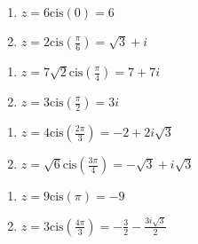 \begin{multicols}{2}

\begin{enumerate}

\setcounter{enumi}{\value{HW}}

\item $z = 6\text{cis}(0) = 6$
\item $z = 2\text{cis}\left(\frac{\pi}{6}\right) = \sqrt{3} + i$

\setcounter{HW}{\value{enumi}}

\end{enumerate}

\end{multicols}

\begin{multicols}{2} 

\begin{enumerate}

\setcounter{enumi}{\value{HW}}

\item $z = 7\sqrt{2}\text{cis}\left(\frac{\pi}{4}\right) = 7+7i$
\item $z = 3\text{cis}\left(\frac{\pi}{2}\right) = 3i$ 

\setcounter{HW}{\value{enumi}}

\end{enumerate}

\end{multicols}

\begin{multicols}{2} 

\begin{enumerate}

\setcounter{enumi}{\value{HW}}

\item $z = 4\text{cis}\left(\frac{2\pi}{3}\right) = -2+2i\sqrt{3}$
\item $z = \sqrt{6}\text{cis}\left(\frac{3\pi}{4}\right) = -\sqrt{3}+i\sqrt{3}$ 

\setcounter{HW}{\value{enumi}}

\end{enumerate}

\end{multicols}

\begin{multicols}{2} 

\begin{enumerate}

\setcounter{enumi}{\value{HW}}

\item $z = 9\text{cis}\left(\pi\right) = -9$
\item $z = 3\text{cis}\left(\frac{4\pi}{3}\right) = -\frac{3}{2} - \frac{3i\sqrt{3}}{2}$

\setcounter{HW}{\value{enumi}}

\end{enumerate}

\end{multicols}

